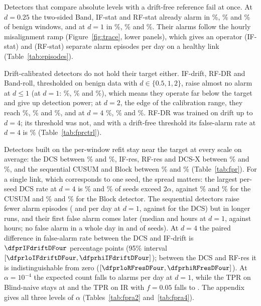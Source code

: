 Detectors that compare absolute levels with a drift-free reference fail at once. At $d=0.25$ the two-sided Band, IF-stat and RF-stat already alarm in \fprBandDQuarter\%, \fprIFstatDQuarter\% and \fprRFstatDQuarter\% of benign windows, and at $d=1$ in \fprBandDOne\%, \fprIFstatDOne\% and \fprRFstatDOne\%. Their alarms follow the hourly misalignment ramp (Figure~\ref{fig:trace}, lower panels), which gives an operator \epiIFstatDOne{} (IF-stat) and \epiRFstatDOne{} (RF-stat) separate alarm episodes per day on a healthy link (Table~\ref{tab:episodes}).

Drift-calibrated detectors do not hold their target either. IF-drift, RF-DR and Band-roll, thresholded on benign data with $d\in\{0.5,1,2\}$, raise almost no alarm at $d\le1$ (at $d=1$: \fprIFdriftDOne\%, \fprRFDRDOne\% and \fprBandrollDOne\%), which means they operate far below the target and give up detection power; at $d=2$, the edge of the calibration range, they reach \fprIFdriftDTwo\%, \fprRFDRDTwo\% and \fprBandrollDTwo\%, and at $d=4$ \fprIFdriftDFour\%, \fprRFDRDFour\% and \fprBandrollDFour\%. RF-DR was trained on drift up to $d=4$; its threshold was not, and with a drift-free threshold its false-alarm rate at $d=4$ is \fprctrlRFDRDFour\% (Table~\ref{tab:fprctrl}).

Detectors built on the per-window refit stay near the target at every scale on average: the DCS between \fprDCSMin\% and \fprDCSMax\%, IF-res, RF-res and DCS-X between \fprResMin\% and \fprResMax\%, and the sequential CUSUM and Block between \fprSeqMin\% and \fprSeqMax\% (Table~\ref{tab:fpr}). For a single link, which corresponds to one seed, the spread matters: the largest per-seed DCS rate at $d=4$ is \fprSeedMaxDCSDFour\% and \fprShareTwoADCSDFour\% of seeds exceed $2\alpha$, against \fprSeedMaxCUSUMDFour\% and \fprShareTwoACUSUMDFour\% for the CUSUM and \fprSeedMaxBlockDFour\% and \fprShareTwoABlockDFour\% for the Block detector. The sequential detectors raise fewer alarm episodes (\epiCUSUMDOne{} and \epiBlockDOne{} per day at $d=1$, against \epiDCSDOne{} for the DCS) but in longer runs, and their first false alarm comes later (median \firstfaCUSUMDOne{} and \firstfaBlockDOne{} hours at $d=1$, against \firstfaDCSDOne{} hours; no false alarm in a whole day in \nofaCUSUMDOne{} and \nofaBlockDOne{} of \nSeeds{} seeds). At $d=4$ the paired difference in false-alarm rate between the DCS and IF-drift is $\dfprIFdriftDFour$ percentage points (95\% interval $[\dfprloIFdriftDFour,\dfprhiIFdriftDFour]$); between the DCS and RF-res it is indistinguishable from zero ($[\dfprloRFresDFour,\dfprhiRFresDFour]$). At $\alpha=10^{-4}$ the expected count falls to \alarmsEfourDCSDOne{} alarms per day at $d=1$, while the TPR on Blind-naive stays at \tprEfourNaiveDCSDOne{} and the TPR on IR with $f=0.05$ falls to \tprEfourIrFiveDCSDOne. The appendix gives all three levels of $\alpha$ (Tables~\ref{tab:fpra2} and~\ref{tab:fpra4}).

